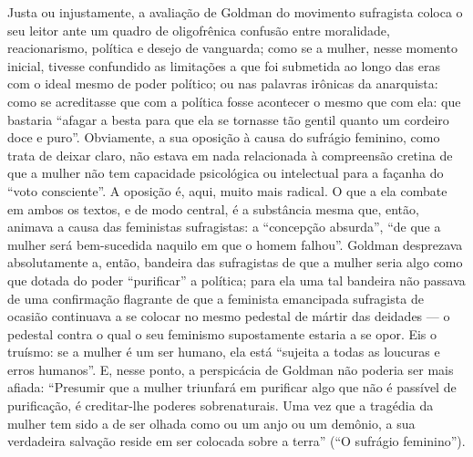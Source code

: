 Justa ou injustamente, a avaliação de Goldman do movimento sufragista
coloca o seu leitor ante um quadro de oligofrênica confusão entre
moralidade, reacionarismo, política e desejo de vanguarda; como se a
mulher, nesse momento inicial, tivesse confundido as limitações a que
foi submetida ao longo das eras com o ideal mesmo de poder político; ou
nas palavras irônicas da anarquista: como se acreditasse que com a
política fosse acontecer o mesmo que com ela: que bastaria ``afagar a
besta para que ela se tornasse tão gentil quanto um cordeiro doce e
puro''. Obviamente, a sua oposição à causa do sufrágio feminino, como
trata de deixar claro, não estava em nada relacionada à compreensão
cretina de que a mulher não tem capacidade psicológica ou intelectual
para a façanha do ``voto consciente''. A oposição é, aqui, muito mais
radical. O que a ela combate em ambos os textos, e de modo central, é a
substância mesma que, então, animava a causa das feministas sufragistas:
a ``concepção absurda'', ``de que a mulher será bem-sucedida naquilo em
que o homem falhou''. Goldman desprezava absolutamente a, então,
bandeira das sufragistas de que a mulher seria algo como que dotada do
poder ``purificar'' a política; para ela uma tal bandeira não passava de
uma confirmação flagrante de que a feminista emancipada sufragista de
ocasião continuava a se colocar no mesmo pedestal de mártir das deidades
--- o pedestal contra o qual o seu feminismo supostamente estaria a se
opor. Eis o truísmo: se a mulher é um ser humano, ela está ``sujeita a
todas as loucuras e erros humanos''. E, nesse ponto, a perspicácia de
Goldman não poderia ser mais afiada: ``Presumir que a mulher triunfará
em purificar algo que não é passível de purificação, é creditar-lhe
poderes sobrenaturais. Uma vez que a tragédia da mulher tem sido a de
ser olhada como ou um anjo ou um demônio, a sua verdadeira salvação
reside em ser colocada sobre a terra'' (``O sufrágio feminino'').


